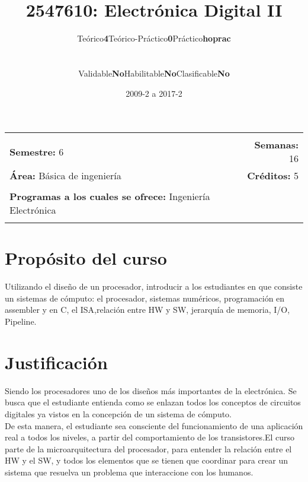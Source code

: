 \documentclass[11pt]{article}
\title{2547610: Electrónica Digital II}
\author{\begin{tabular} {c|c|c|c|c|c} Teórico & \textbf{4} & Teórico-Práctico & \textbf{0} & Práctico & \textbf{hoprac}\end{tabular}
\\
\begin{tabular} {c|c|c|c|c|c} Validable & \textbf{No} & Habilitable & \textbf{No} & Clasificable & \textbf{No}\end{tabular}}
\date{2009-2 a 2017-2}
\newcommand{\blankline}{\quad\pagebreak[2]}
\begin{document}
\maketitle

\begin{tabular*}{.93\textwidth}{@{\extracolsep{\fill}}lr}
\hline\\

\textbf{Semestre:} 6 & \textbf{Semanas:} 16
\\
\textbf{Área:} Básica de ingeniería &    \textbf{Créditos:} 5 
\\ & \\
\textbf{Programas a los cuales se ofrece:} Ingeniería Electrónica
\\ & \\
\hline
\end{tabular*}

\vspace{5 mm}

\section*{Propósito del curso}

Utilizando el diseño de un procesador, introducir a los estudiantes en que consiste un sistemas de cómputo: el procesador, sistemas numéricos, programación en assembler y en C, el ISA,relación entre HW y SW, jerarquía de memoria, I/O, Pipeline.



\section*{Justificación}

Siendo los procesadores uno de los diseños más importantes de la electrónica. Se busca que el estudiante entienda como se enlazan todos los conceptos de circuitos digitales ya vistos en la concepción de un sistema de cómputo.\\De esta manera, el estudiante sea consciente del funcionamiento de una aplicación real a todos los niveles, a partir del comportamiento de los transistores.El curso parte de la microarquitectura del procesador, para entender la relación entre el HW y el SW, y todos los elementos que se tienen que coordinar para crear un sistema que resuelva un problema que interaccione con los humanos.
\end{document}
